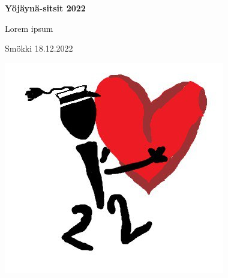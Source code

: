 \documentclass[10pt, a4paper]{article}
\begin{document}
\begin{center}


\vspace*{1.5cm}
\textbf{\sc\Huge Yöjäynä-sitsit 2022}


\vspace{0.2cm}


\vspace{0.2cm}

\sc\Large Lorem ipsum

\sc\Large Smökki 18.12.2022

\vspace{1cm}

\includegraphics[scale=1.0]{kuvat/YJ22logo.png}

\end{center}
\end{document}
